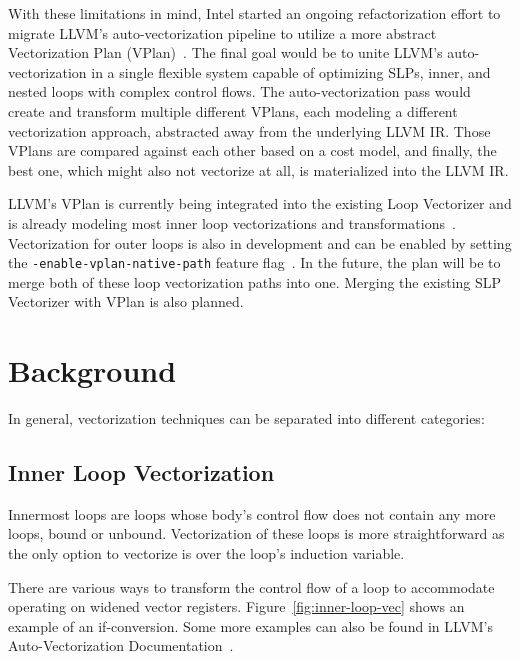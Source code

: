 \documentclass[sigplan,11pt,nonacm]{acmart}
\begin{document}
With these limitations in mind, Intel started an ongoing refactorization effort to migrate LLVM's
auto-vectorization pipeline to utilize a more abstract Vectorization Plan 
(VPlan)~\cite{llvmextloopvec,llvmvplan}. The final goal would be to unite LLVM's auto-vectorization
in a single flexible system capable of optimizing SLPs, inner, and nested loops with complex 
control flows. The auto-vectorization pass would create and transform multiple different 
VPlans, each modeling a different vectorization approach, abstracted away from the underlying LLVM IR.
Those VPlans are compared against each other based on a cost model, and finally, the best one, which
might also not vectorize at all, is materialized into the LLVM IR.

LLVM's VPlan is currently being integrated into the existing Loop Vectorizer and is
already modeling most inner loop vectorizations and transformations~\cite{llvmvplanupdate}. 
Vectorization for outer loops is also in development and can be enabled by setting 
the \texttt{-enable-vplan-native-path} feature flag~\cite{llvmouterloop,llvmouterloopstatus}. 
In the future, the plan will be to merge both of these loop vectorization paths into one. 
Merging the existing SLP Vectorizer with VPlan is also planned.




\section{Background}
\label{sec:background}
In general, vectorization techniques can be separated into different categories:

\subsection{Inner Loop Vectorization}
Innermost loops are loops whose body's control flow does not contain any more loops, bound or unbound.
Vectorization of these loops is more straightforward as the only option to vectorize is over 
the loop's induction variable.

There are various ways to transform the control flow of a loop to accommodate operating on widened
vector registers. Figure~\ref{fig:inner-loop-vec} shows an example of an if-conversion. Some more
examples can also be found in LLVM's Auto-Vectorization Documentation~\cite{llvmvec}.
\end{document}
